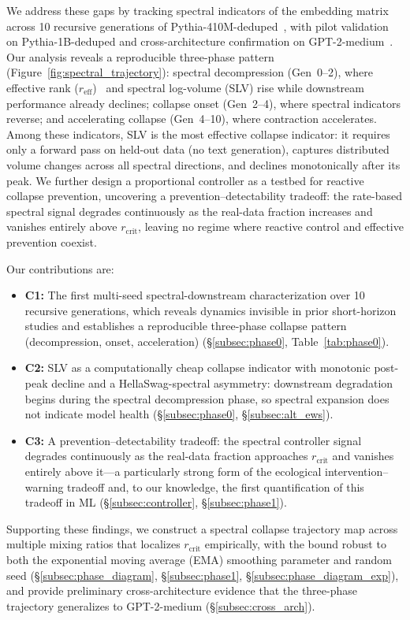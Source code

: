 We address these gaps by tracking spectral indicators of the embedding matrix across 10 recursive generations of Pythia-410M-deduped~\citep{biderman2023pythia}, with pilot validation on Pythia-1B-deduped and cross-architecture confirmation on GPT-2-medium~\citep{radford2019language}.
Our analysis reveals a reproducible three-phase pattern (Figure~\ref{fig:spectral_trajectory}): spectral decompression (Gen~0--2), where effective rank ($r_{\text{eff}}$)~\citep{roy2007effectiverank} and spectral log-volume (SLV) rise while downstream performance already declines; collapse onset (Gen~2--4), where spectral indicators reverse; and accelerating collapse (Gen~4--10), where contraction accelerates.
Among these indicators, SLV is the most effective collapse indicator: it requires only a forward pass on held-out data (no text generation), captures distributed volume changes across all spectral directions, and declines monotonically after its peak.
We further design a proportional controller as a testbed for reactive collapse prevention, uncovering a prevention--detectability tradeoff: the rate-based spectral signal degrades continuously as the real-data fraction increases and vanishes entirely above $r_{\text{crit}}$, leaving no regime where reactive control and effective prevention coexist.

Our contributions are:
\begin{itemize}
\item \textbf{C1:} The first multi-seed spectral-downstream characterization over 10 recursive generations, which reveals dynamics invisible in prior short-horizon studies and establishes a reproducible three-phase collapse pattern (decompression, onset, acceleration) (\S\ref{subsec:phase0}, Table~\ref{tab:phase0}).
\item \textbf{C2:} SLV as a computationally cheap collapse indicator with monotonic post-peak decline and a HellaSwag-spectral asymmetry: downstream degradation begins during the spectral decompression phase, so spectral expansion does not indicate model health (\S\ref{subsec:phase0}, \S\ref{subsec:alt_ews}).
\item \textbf{C3:} A prevention--detectability tradeoff: the spectral controller signal degrades continuously as the real-data fraction approaches $r_{\text{crit}}$ and vanishes entirely above it---a particularly strong form of the ecological intervention--warning tradeoff and, to our knowledge, the first quantification of this tradeoff in ML (\S\ref{subsec:controller}, \S\ref{subsec:phase1}).
\end{itemize}
Supporting these findings, we construct a spectral collapse trajectory map across multiple mixing ratios that localizes $r_{\text{crit}}$ empirically, with the bound robust to both the exponential moving average (EMA) smoothing parameter and random seed (\S\ref{subsec:phase_diagram}, \S\ref{subsec:phase1}, \S\ref{subsec:phase_diagram_exp}), and provide preliminary cross-architecture evidence that the three-phase trajectory generalizes to GPT-2-medium (\S\ref{subsec:cross_arch}).

